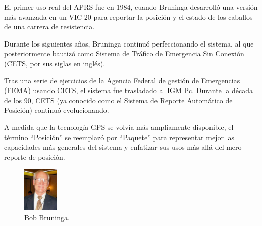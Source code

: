 El primer uso real del APRS fue en 1984, cuando Bruninga desarrolló una versión más avanzada en un VIC-20 para reportar la posición y el estado de los caballos de una carrera de resistencia.

Durante los siguientes años, Bruninga continuó perfeccionando el sistema, al que posteriormente bautizó como Sistema de Tráfico de Emergencia Sin Conexión (CETS, por sus siglas en inglés).

Tras una serie de ejercicios de la Agencia Federal de gestión de Emergencias (FEMA) usando CETS, el sistema fue trasladado al IGM Pc. Durante la década de los 90, CETS (ya conocido como el Sistema de Reporte Automático de Posición) continuó evolucionando.

A medida que la tecnología GPS se volvía más ampliamente disponible, el término ``Posición'' se reemplazó por ``Paquete'' para representar mejor las capacidades más generales del sistema y enfatizar sus usos más allá del mero reporte de posición.

\begin{figure}[h]
	\centering
	\includegraphics[width=0.15\textwidth]{Imagenes/Chapter_1/bob_bruninga.png}
	\caption{Bob Bruninga.}
	\label{fig:bob-bruninga}
\end{figure}